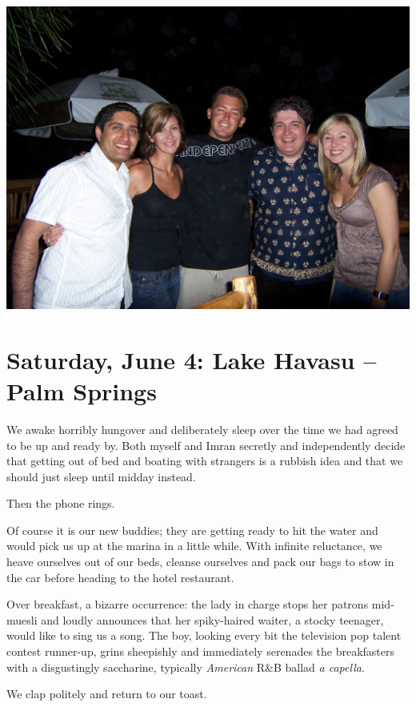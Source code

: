 \documentclass[a5paper,titlepage,11pt]{book}
\begin{document}
\begin{center}\includegraphics[width=\textwidth]{gfx/100_1579}\end{center}

\chapter[Lake Havasu -- Palm Springs]{Saturday, June 4:  Lake Havasu -- Palm Springs}
We awake horribly hungover and deliberately sleep over the time we had agreed to be up and ready by. Both myself and Imran secretly and independently decide that getting out of bed and boating with strangers is a rubbish idea and that we should just sleep until midday instead.

Then the phone rings.

Of course it is our new buddies; they are getting ready to hit the water and would pick us up at the marina in a little while. With infinite reluctance, we heave ourselves out of our beds, cleanse ourselves and pack our bags to stow in the car before heading to the hotel restaurant.

Over breakfast, a bizarre occurrence:  the lady in charge stops her patrons mid-muesli and loudly announces that her spiky-haired waiter, a stocky teenager, would like to sing us a song. The boy, looking every bit the television pop talent contest runner-up, grins sheepishly and immediately serenades the breakfasters with a disgustingly saccharine, typically \emph{American} R\&B ballad \emph{a capella}.

We clap politely and return to our toast.
\end{document}
